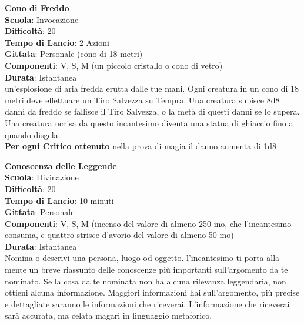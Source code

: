 \begin{multicols}{2}
\medskip\textbf{Cono di Freddo}\\
\textbf{Scuola}: Invocazione\\
\textbf{Difficoltà}:  20\\
\textbf{Tempo di Lancio}: 2 Azioni\\
\textbf{Gittata}: Personale (cono di 18 metri)\\
\textbf{Componenti}: V, S, M (un piccolo cristallo o cono di vetro)\\
\textbf{Durata}: Istantanea\\
un'esplosione di aria fredda erutta dalle tue mani. Ogni creatura in un cono di 18 metri deve effettuare un Tiro Salvezza su Tempra. Una creatura subisce 8d8 danni da freddo se fallisce il Tiro Salvezza, o la metà di questi danni se lo supera. Una creatura uccisa da questo incantesimo diventa una statua di ghiaccio fino a quando disgela.\\
\textbf{Per ogni Critico ottenuto} nella prova di magia il danno aumenta di 1d8

\medskip\textbf{Conoscenza delle Leggende}\\
\textbf{Scuola}: Divinazione\\
\textbf{Difficoltà}:  20\\
\textbf{Tempo di Lancio}: 10 minuti\\
\textbf{Gittata}: Personale\\
\textbf{Componenti}: V, S, M (incenso del valore di almeno 250 mo, che l'incantesimo consuma, e quattro strisce d’avorio del valore di almeno 50 mo)\\
\textbf{Durata}: Istantanea\\
Nomina o descrivi una persona, luogo od oggetto. l'incantesimo ti porta alla mente un breve riassunto delle conoscenze più importanti sull'argomento da te nominato. Se la cosa da te nominata non ha alcuna rilevanza leggendaria, non ottieni alcuna informazione. Maggiori informazioni hai sull'argomento, più precise e dettagliate saranno le informazioni che riceverai. L’informazione che riceverai sarà accurata, ma celata magari in linguaggio metaforico.


\end{multicols}

